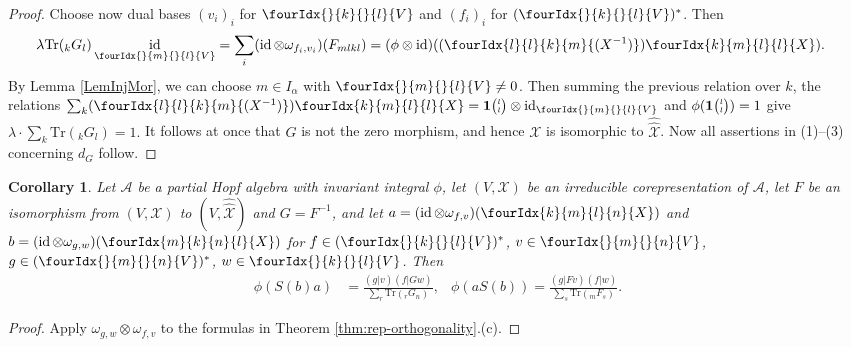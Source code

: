 \documentclass[10pt]{article}
\DeclareMathOperator{\id}{id}
\newcommand{\dual}[1]{#1^{*}}
\newcommand{\dualco}[1]{\hat{#1}}
\newcommand{\Tr}{\mathrm{Tr}}
\newcommand{\GrDA}[3]{{}_{#2}#1_{#3}} %
\newcommand{\Grt}[3]{#1{\tiny {\begin{pmatrix} #2\\#3\end{pmatrix}}}}
\newcommand{\UnitC}[2]{\Grt{\mathbf{1}}{#1}{#2}}
\newcommand{\Gr}[5]{\fourIdx{#2}{#4}{#3}{#5}{#1}}%
\newcommand{\Gru}[3]{\Gr{#1}{}{}{#2}{#3}}
\newtheorem{Cor}[Theorem]{Corollary}
\theoremstyle{definition}
\numberwithin{equation}{section}
\begin{document}
\begin{proof}
  Choose now dual  bases
  $(v_{i})_{i}$ for $\Gru{V}{k}{l}$ and $(f_{i})_{i}$ for  $\dual{(\Gru{V}{k}{l})}$. Then
  \begin{align*}
    \lambda   \Tr( \GrDA{G}{k}{l}) \id_{\Gru{V}{m}{l}}
 &= \sum_{i} (\id \otimes
    \omega_{f_{i},v_{i}})(F_{mlkl}) = (\phi \otimes
    \id)((\Gr{(X^{-1})}{l}{k}{l}{m}) \Gr{X}{k}{l}{m}{l}).
  \end{align*}
   By Lemma \ref{LemInjMor}, we can choose $m\in I_{\alpha}$ with $\Gru{V}{m}{l}\neq 0$.   Then summing the previous relation over $k$, the relations $\sum_{k}
  (\Gr{(X^{-1})}{l}{k}{l}{m}) \Gr{X}{k}{l}{m}{l} = \UnitC{l}{l}
  \otimes \id_{\Gru{V}{m}{l}}$ and
  $\phi(\UnitC{l}{l})=1$ give $\lambda \cdot  \sum_{k} \Tr(\GrDA{G}{k}{l}) = 1.$ It follows at once that $G$ is not the zero morphism, and hence $\mathscr{X}$ is isomorphic to $\hat{\hat{\mathscr{X}}}$.  Now all assertions in (1)--(3) concerning $d_G$ follow.
\end{proof}


\begin{Cor}\label{CorOrth}
  Let $\mathscr{A}$ be a %
partial Hopf algebra with invariant integral $\phi$, let
  $(V,\mathscr{X})$ be an irreducible corepresentation of
  $\mathscr{A}$, let $F$ be an isomorphism from
  $(V,\mathscr{X})$ to $(V,\dualco{\dualco{\mathscr{X}}})$ and
  $G=F^{-1}$, and let $a=(\id \otimes
  \omega_{f,v})(\Gr{X}{k}{l}{m}{n})$ and $b=(\id \otimes
  \omega_{g,w})(\Gr{X}{m}{n}{k}{l})$ for
  $f \in   \dual{(\Gru{V}{k}{l})}$, $v \in\Gru{V}{m}{n}$, $g \in
  \dual{(\Gru{V}{m}{n})}$, $w \in  \Gru{V}{k}{l}$.  Then
\begin{align*}
  \phi(S(b)a) &= \frac{(g|v)(f|Gw)}{\sum_{r}
    \Tr(\GrDA{G}{r}{n})}, & \phi(aS(b)) = \frac{(g|Fv)(f|w)}{\sum_{s}
    \Tr(\GrDA{F}{m}{s})}.
\end{align*}
\end{Cor}
\begin{proof}
Apply $\omega_{g,w} \otimes
    \omega_{f,v}$ to the formulas in  Theorem
    \ref{thm:rep-orthogonality}.(c).
\end{proof}
\end{document}
